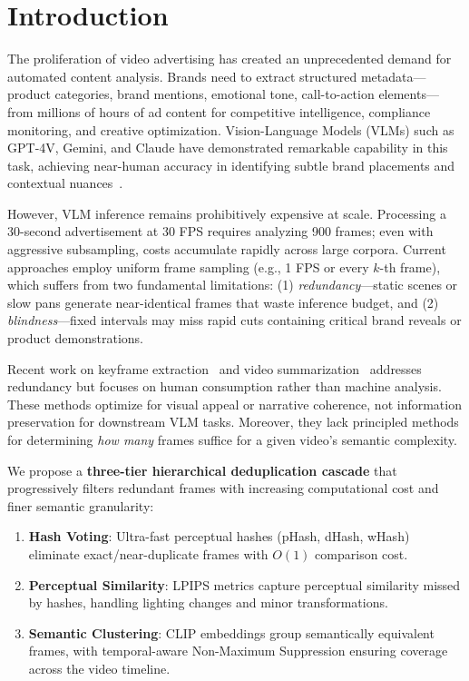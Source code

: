 \section{Introduction}
\label{sec:introduction}

The proliferation of video advertising has created an unprecedented demand for automated content analysis. Brands need to extract structured metadata---product categories, brand mentions, emotional tone, call-to-action elements---from millions of hours of ad content for competitive intelligence, compliance monitoring, and creative optimization. Vision-Language Models (VLMs) such as GPT-4V, Gemini, and Claude have demonstrated remarkable capability in this task, achieving near-human accuracy in identifying subtle brand placements and contextual nuances~\cite{liu2023visual, team2023gemini}.

However, VLM inference remains prohibitively expensive at scale. Processing a 30-second advertisement at 30 FPS requires analyzing 900 frames; even with aggressive subsampling, costs accumulate rapidly across large corpora. Current approaches employ uniform frame sampling (e.g., 1 FPS or every $k$-th frame), which suffers from two fundamental limitations: (1) \textit{redundancy}---static scenes or slow pans generate near-identical frames that waste inference budget, and (2) \textit{blindness}---fixed intervals may miss rapid cuts containing critical brand reveals or product demonstrations.

Recent work on keyframe extraction~\cite{potapov2014category, singh2022temporal} and video summarization~\cite{zhou2018deep, zhao2021video} addresses redundancy but focuses on human consumption rather than machine analysis. These methods optimize for visual appeal or narrative coherence, not information preservation for downstream VLM tasks. Moreover, they lack principled methods for determining \textit{how many} frames suffice for a given video's semantic complexity.

We propose a \textbf{three-tier hierarchical deduplication cascade} that progressively filters redundant frames with increasing computational cost and finer semantic granularity:
\begin{enumerate}
    \item \textbf{Hash Voting}: Ultra-fast perceptual hashes (pHash, dHash, wHash) eliminate exact/near-duplicate frames with $O(1)$ comparison cost.
    \item \textbf{Perceptual Similarity}: LPIPS metrics capture perceptual similarity missed by hashes, handling lighting changes and minor transformations.
    \item \textbf{Semantic Clustering}: CLIP embeddings group semantically equivalent frames, with temporal-aware Non-Maximum Suppression ensuring coverage across the video timeline.
\end{enumerate}

